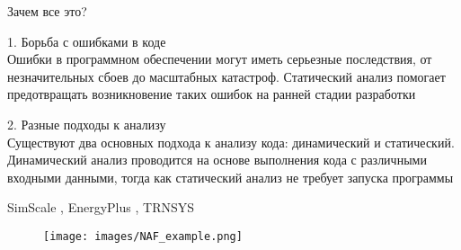 Зачем все это?

1. Борьба с ошибками в коде\\
Ошибки в программном обеспечении могут иметь серьезные последствия, от незначительных сбоев до масштабных катастроф. Статический анализ помогает предотвращать возникновение таких ошибок на ранней стадии разработки

2. Разные подходы к анализу\\
Существуют два основных подхода к анализу кода: динамический и статический. Динамический анализ проводится на основе выполнения кода с различными входными данными, тогда как статический анализ не требует запуска программы



\newpage
{}



\newpage
{}
SimScale \cite{simscale}, EnergyPlus \cite{energyplus}, TRNSYS \cite{trnsys}

\newpage

\begin{figure}[H]
\texttt{[image: images/NAF\_example.png]}
\caption{}
\label{NAF}
\end{figure}

